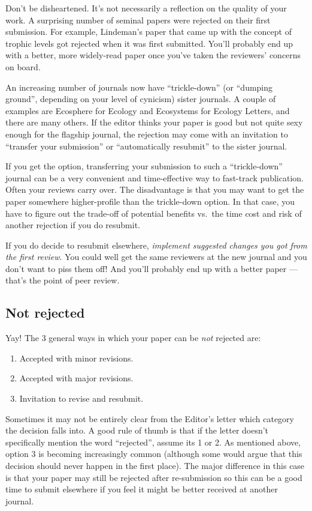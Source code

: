 \documentclass[11pt,]{article}
\begin{document}
Don't be disheartened. It's not necessarily a reflection on the quality
of your work. A surprising number of seminal papers were rejected on
their first submission. For example, Lindeman's paper that came up with
the concept of trophic levels got rejected when it was first submitted.
You'll probably end up with a better, more widely-read paper once you've
taken the reviewers' concerns on board.

An increasing number of journals now have ``trickle-down'' (or ``dumping
ground'', depending on your level of cynicism) sister journals. A couple
of examples are Ecosphere for Ecology and Ecosystems for Ecology
Letters, and there are many others. If the editor thinks your paper is
good but not quite sexy enough for the flagship journal, the rejection
may come with an invitation to ``transfer your submission'' or
``automatically resubmit'' to the sister journal.

If you get the option, transferring your submission to such a
``trickle-down'' journal can be a very convenient and time-effective way
to fast-track publication. Often your reviews carry over. The
disadvantage is that you may want to get the paper somewhere
higher-profile than the trickle-down option. In that case, you have to
figure out the trade-off of potential benefits vs.~the time cost and
risk of another rejection if you do resubmit.

If you do decide to resubmit elsewhere, \emph{implement suggested
changes you got from the first review}. You could well get the same
reviewers at the new journal and you don't want to piss them off! And
you'll probably end up with a better paper --- that's the point of peer
review.

\subsection{Not rejected}\label{not-rejected}

Yay! The 3 general ways in which your paper can be \emph{not} rejected
are:

\begin{enumerate}
\def\labelenumi{\arabic{enumi}.}
\itemsep1pt\parskip0pt
\item
  Accepted with minor revisions.
\item
  Accepted with major revisions.
\item
  Invitation to revise and resubmit.
\end{enumerate}

Sometimes it may not be entirely clear from the Editor's letter which
category the decision falls into. A good rule of thumb is that if the
letter doesn't specifically mention the word ``rejected'', assume its 1
or 2. As mentioned above, option 3 is becoming increasingly common
(although some would argue that this decision should never happen in the
first place). The major difference in this case is that your paper may
still be rejected after re-submission so this can be a good time to
submit elsewhere if you feel it might be better received at another
journal.
\end{document}
